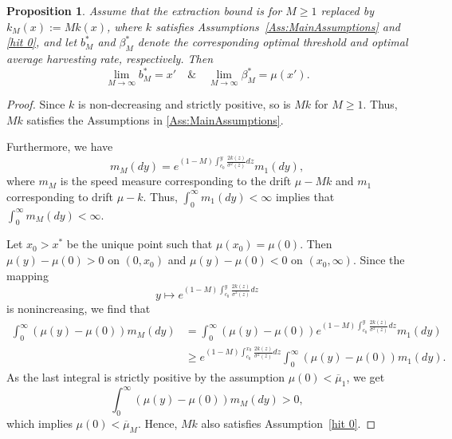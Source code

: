 \documentclass[12pt]{article}
\newtheorem{proposition}[theorem]{Proposition}
\begin{document}
\begin{proposition} \label{Prop: limitharvesting}
    Assume that the extraction bound is for $M\geq 1$ replaced by $k_M(x):=M k(x)$, where $k$ satisfies Assumptions~\ref{Ass:MainAssumptions} and \ref{hit 0}, and let $b_M^*$ and $\beta_M^*$ denote the corresponding optimal threshold and optimal average harvesting rate, respectively. Then
    \begin{equation*}
        \lim_{M \to \infty} b_M^* = x' \quad\&\quad \lim_{M \to \infty} \beta_M^* = \mu(x').
    \end{equation*}
\end{proposition}

\begin{proof} 
    Since $k$ is non-decreasing and strictly positive, so is $M k$ for $M \geq 1$. Thus, $M k$ satisfies the Assumptions in \ref{Ass:MainAssumptions}. 
    
    Furthermore, we have
    \begin{equation*}
        m_M(dy) = e^{(1-M)\int^y_{c_0} \frac{2k(z)}{\sigma^2(z)}dz } m_1(dy),
    \end{equation*}
    where $m_{M}$ is the speed measure corresponding to the drift $\mu-Mk$ and $m_1$ corresponding to drift $\mu-k$. Thus, $\int_0^{\infty} m_1(dy) < \infty$ implies that $\int_0^{\infty} m_M(dy) < \infty$.

    Let $x_0 > x^*$ be the unique point such that $\mu(x_0)=\mu(0)$.
    Then $\mu(y)-\mu(0) > 0$ on $(0,x_0)$ and $\mu(y)-\mu(0) < 0$ on $(x_0, \infty)$. Since the mapping 
    \begin{equation*}
        y \mapsto e^{(1-M)\int^y_{c_0} \frac{2k(z)}{\sigma^2(z)}dz }
    \end{equation*}
    is nonincreasing, we find that
    \begin{align*}
        \int_0^\infty(\mu(y)-\mu(0))m_M(dy) & =\int_0^\infty(\mu(y)-\mu(0))e^{(1-M)\int^y _{c_0}\frac{2k(z)}{\sigma^2(z)}dz }m_1(dy) \\
        & \geq e^{(1-M)\int^{x_0}_{c_0} \frac{2k(z)}{\sigma^2(z)}dz }\int_0^\infty(\mu(y)-\mu(0))m_1(dy).
    \end{align*}
    As the last integral is strictly positive by the assumption $\mu(0) < \overline\mu_1$, we get
    \begin{equation*}
        \int_0^\infty(\mu(y)-\mu(0))m_M(dy)>0,
    \end{equation*}
    which implies $\mu(0)<\overline\mu_M$. Hence, $Mk$ also satisfies Assumption~\ref{hit 0}.


\end{proof}
\end{document}
